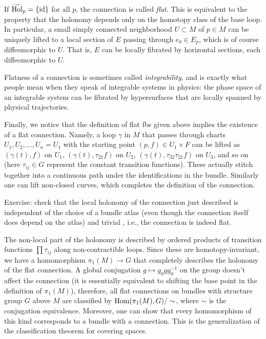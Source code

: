 \begin{example}
	If $\widetilde{\mathrm{Hol}}_p=\{\operatorname{id}\}$ for all $p$, the connection is called \emph{flat}. This is equivalent to the property that the holonomy depends only on the homotopy class of the base loop. In particular, a small simply connected neighborhood $U\subset M$ of $p\in M$ can be uniquely lifted to a local section of $E$ passing through $e_0\in E_p$, which is of course diffeomorphic to $U$. That is, $E$ can be locally fibrated by horizontal sections, each diffeomorphic to $U$. 
	
	Flatness of a connection is sometimes called \emph{integrability}, and is exactly what people mean when they speak of integrable systems in physics: the phase space of an integrable system can be fibrated by hypersurfaces that are locally spanned by physical trajectories.
	
	Finally, we notice that the definition of flat \glspl{fb} given above implies the existence of a flat connection. Namely, a loop $\gamma$ in $M$ that passes through charts $U_1,U_2,\ldots,U_n=U_1$ with the starting point $(p,f)\in U_1\times F$ can be lifted as $(\gamma(t),f)$ on $U_1$, $(\gamma(t),\tau_{21}f)$ on $U_2$, $(\gamma(t),\tau_{32}\tau_{21}f)$ on $U_3$, and so on (here $\tau_{ij}\in G$ represent the constant transition functions). These actually stitch together into a continuous path under the identifications in the bundle. Similarly one can lift non-closed curves, which completes the definition of the connection.
	
	Exercise: check that the local holonomy of the connection just described is independent of the choice of a bundle atlas (even though the connection itself does depend on the atlas) and trivial , i.e., the connection is indeed flat.
	
	The non-local part of the holonomy is described by ordered products of transition functions $\prod \tau_{ij}$ along non-contractible loops. Since these are homotopy-invariant, we have a homomorphism $\pi_1(M)\to G$ that completely describes the holonomy of the flat connection. A global conjugation $g\mapsto g_0 g g_0^{-1}$ on the group doesn't affect the connection (it is essentially equivalent to shifting the base point in the definition of $\pi_1(M)$), therefore, all flat connections on bundles with structure group $G$ above $M$ are classified by $\operatorname{Hom}(\pi_1(M),G)/\sim$, where $\sim$ is the conjugation equivalence. Moreover, one can show that every homomorphism of this kind corresponds to a bundle with a connection. This is the generalization of the classification theorem for covering spaces.
	

\end{example}
